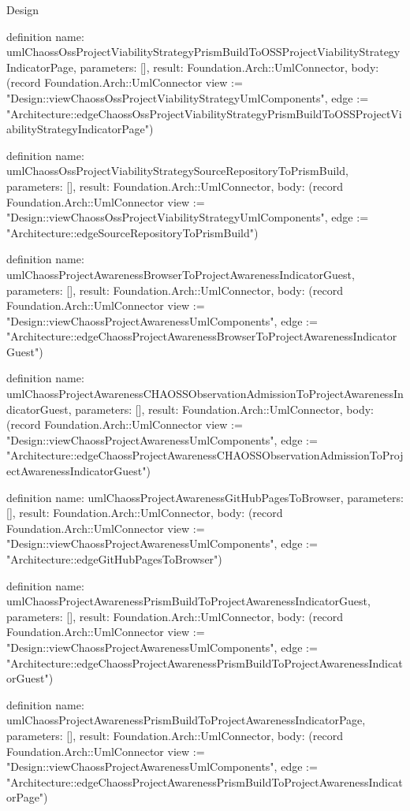 \begin{lexlean}{Design}
\begin{semanticmodule}
definition{
  name: umlChaossOssProjectViabilityStrategyPrismBuildToOSSProjectViabilityStrategyIndicatorPage,
  parameters: [],
  result: Foundation.Arch::UmlConnector,
  body: (record Foundation.Arch::UmlConnector {view := "Design::viewChaossOssProjectViabilityStrategyUmlComponents", edge := "Architecture::edgeChaossOssProjectViabilityStrategyPrismBuildToOSSProjectViabilityStrategyIndicatorPage"})
}

definition{
  name: umlChaossOssProjectViabilityStrategySourceRepositoryToPrismBuild,
  parameters: [],
  result: Foundation.Arch::UmlConnector,
  body: (record Foundation.Arch::UmlConnector {view := "Design::viewChaossOssProjectViabilityStrategyUmlComponents", edge := "Architecture::edgeSourceRepositoryToPrismBuild"})
}

definition{
  name: umlChaossProjectAwarenessBrowserToProjectAwarenessIndicatorGuest,
  parameters: [],
  result: Foundation.Arch::UmlConnector,
  body: (record Foundation.Arch::UmlConnector {view := "Design::viewChaossProjectAwarenessUmlComponents", edge := "Architecture::edgeChaossProjectAwarenessBrowserToProjectAwarenessIndicatorGuest"})
}

definition{
  name: umlChaossProjectAwarenessCHAOSSObservationAdmissionToProjectAwarenessIndicatorGuest,
  parameters: [],
  result: Foundation.Arch::UmlConnector,
  body: (record Foundation.Arch::UmlConnector {view := "Design::viewChaossProjectAwarenessUmlComponents", edge := "Architecture::edgeChaossProjectAwarenessCHAOSSObservationAdmissionToProjectAwarenessIndicatorGuest"})
}

definition{
  name: umlChaossProjectAwarenessGitHubPagesToBrowser,
  parameters: [],
  result: Foundation.Arch::UmlConnector,
  body: (record Foundation.Arch::UmlConnector {view := "Design::viewChaossProjectAwarenessUmlComponents", edge := "Architecture::edgeGitHubPagesToBrowser"})
}

definition{
  name: umlChaossProjectAwarenessPrismBuildToProjectAwarenessIndicatorGuest,
  parameters: [],
  result: Foundation.Arch::UmlConnector,
  body: (record Foundation.Arch::UmlConnector {view := "Design::viewChaossProjectAwarenessUmlComponents", edge := "Architecture::edgeChaossProjectAwarenessPrismBuildToProjectAwarenessIndicatorGuest"})
}

definition{
  name: umlChaossProjectAwarenessPrismBuildToProjectAwarenessIndicatorPage,
  parameters: [],
  result: Foundation.Arch::UmlConnector,
  body: (record Foundation.Arch::UmlConnector {view := "Design::viewChaossProjectAwarenessUmlComponents", edge := "Architecture::edgeChaossProjectAwarenessPrismBuildToProjectAwarenessIndicatorPage"})
}


\end{semanticmodule}
\end{lexlean}
